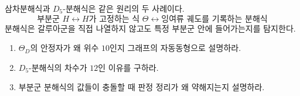 \begin{keyidea}
삼차분해식과 $D_5$-분해식은 같은 원리의 두 사례이다.
\[
  \boxed{
  \text{부분군 }H
  \longleftrightarrow
  \text{$H$가 고정하는 식 }\Theta
  \longleftrightarrow
  \text{잉여류 궤도를 기록하는 분해식}
  }
\]
분해식은 갈루아군을 직접 나열하지 않고도 특정 부분군 안에 들어가는지를 탐지한다.
\end{keyidea}

\begin{checkpoint}
\begin{enumerate}[label=(\alph*)]
  \item $\Theta_D$의 안정자가 왜 위수 $10$인지 그래프의 자동동형으로 설명하라.
  \item $D_5$-분해식의 차수가 $12$인 이유를 구하라.
  \item 부분군 분해식의 값들이 충돌할 때 판정 정리가 왜 약해지는지 설명하라.
\end{enumerate}
\end{checkpoint}
